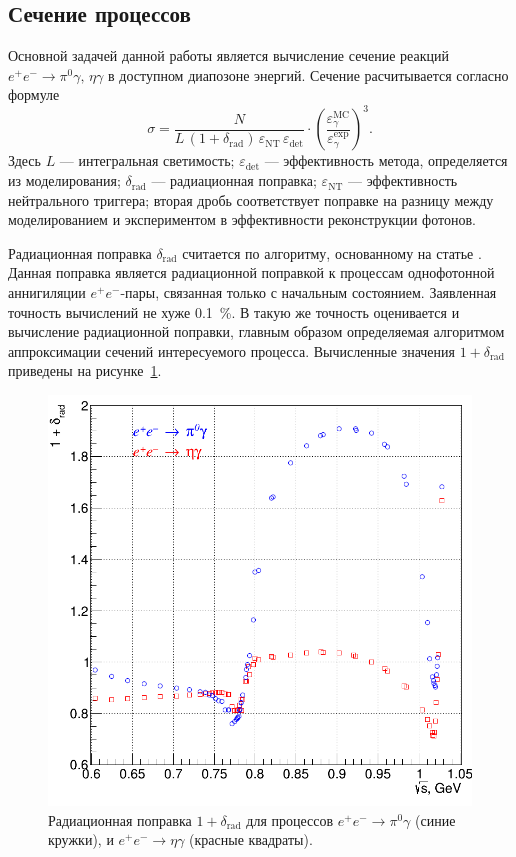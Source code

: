 \subsection{Сечение процессов}

Основной задачей данной работы является вычисление сечение реакций
$e^+e^- \to \pi^0 \gamma, \, \eta \gamma$ в доступном диапозоне энергий.
Сечение расчитывается согласно формуле
\begin{equation}
	\sigma = \frac{ N } { L \, (1+\delta_{\text{rad}}) \, \varepsilon_{\text{NT}} \,
	\varepsilon_{\text{det}}} \cdot  
	\left( \frac{ {\varepsilon^{\text{MC}}_{\gamma}} }{ {\varepsilon^{\text{exp}}_{\gamma}} } \right)^3.
\end{equation}
Здесь $L$ --- интегральная светимость;
$\varepsilon_{\text{det}}$ --- эффективность метода, определяется из моделирования;
$\delta_{\text{rad}}$ --- радиационная поправка;
$\varepsilon_{\text{NT}}$ --- эффективность нейтрального триггера;
вторая дробь соответствует поправке на разницу между моделированием и экспериментом в эффективности
реконструкции фотонов.

Радиационная поправка $\delta_{\text{rad}}$ считается по алгоритму, основанному на статье \cite{Kuraev1985}.
Данная поправка является радиационной поправкой к процессам однофотонной аннигиляции $e^+ e^-$-пары,
связанная только с начальным состоянием.
Заявленная точность вычислений не хуже \SI{0.1}{\percent}.
В такую же точность оценивается и вычисление радиационной поправки,
главным образом определяемая алгоритмом аппроксимации сечений интересуемого процесса.
Вычисленные значения $1+\delta_{\text{rad}}$ приведены на рисунке~\ref{fig:rad_corr}.

\begin{figure}[htbp]
	\centering
	\includegraphics[width=.5\textwidth]{img/rad_corr_for_pseudodisser.png}
	\caption{Радиационная поправка $1+\delta_{\text{rad}}$ для процессов
		$e^+ e^- \to \pi^0 \gamma$ (синие кружки),
		и $e^+ e^- \to \eta \gamma$ (красные квадраты).}\label{fig:rad_corr}
\end{figure}

